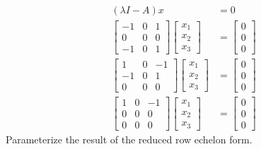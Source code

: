 \documentclass[12pt]{article}
\begin{document}
\begin{align*}
    (\lambda I - A)x &= 0\\
    \begin{bmatrix}-1&0&1\\0&0&0\\-1&0&1\end{bmatrix} \begin{bmatrix}x_1\\x_2\\x_3\end{bmatrix} &= \begin{bmatrix}0\\0\\0\end{bmatrix}\\
    \begin{bmatrix}1&0&-1\\-1&0&1\\0&0&0\end{bmatrix} \begin{bmatrix}x_1\\x_2\\x_3\end{bmatrix} &= \begin{bmatrix}0\\0\\0\end{bmatrix}\\
    \begin{bmatrix}1&0&-1\\0&0&0\\0&0&0\end{bmatrix} \begin{bmatrix}x_1\\x_2\\x_3\end{bmatrix} &= \begin{bmatrix}0\\0\\0\end{bmatrix}
\end{align*}
Parameterize the result of the reduced row echelon form.
\end{document}
